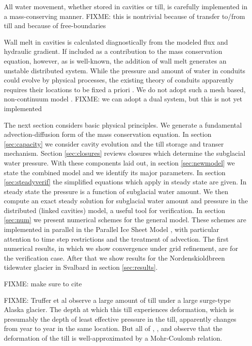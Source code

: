 \documentclass[11pt,final]{amsart}
\begin{document}
All water movement, whether stored in cavities or till, is carefully implemented in a mass-conserving manner.  FIXME: this is nontrivial because of transfer to/from till and because of free-boundaries

Wall melt in cavities is calculated diagnostically from the modeled flux and hydraulic gradient.  If included as a contribution to the mass conservation equation, however, as is well-known, the addition of wall melt generates an unstable distributed system.  While the pressure and amount of water in conduits could evolve by physical processes, the existing theory of conduits apparently requires their locations to be fixed a priori \citep{Hewittetal2012,PimentelFlowers2011,Schoofmeltsupply}.  We do not adopt such a mesh based, non-continuum model \citep[compare][]{Hewittetal2012}.  FIXME: we can adopt a dual system, but this is not yet implemented

The next section considers basic physical principles.  We generate a fundamental advection-diffusion form of the mass conservation equation.  In section \ref{sec:capacity} we consider cavity evolution and the till storage and transer mechanism.  Section \ref{sec:closures} reviews closures which determine the subglacial water pressure.  With these components laid out, in section \ref{sec:newmodel} we state the combined model and we identify its major parameters.  In section \ref{sec:steadyverif} the simplified equations which apply in steady state are given.  In steady state the pressure is a function of subglacial water amount.  We then compute an exact steady solution for subglacial water amount and pressure in the distributed (linked cavities) model, a useful tool for verification.  In section \ref{sec:num} we present numerical schemes for the general model.  These schemes are implemented in parallel in the Parallel Ice Sheet Model \citep{pism-user-manual}, with particular attention to time step restrictions and the treatment of advection.  The first numerical results, in which we show convergence under grid refinement, are for the verification case.  After that we show results for the Nordenskioldbreen tidewater glacier in Svalbard in section \ref{sec:results}.

FIXME:  make sure to cite \citep{Hewitt2013,vanderWeletal2013}

FIXME:  Truffer et al \citep{TrufferHarrisonEchelmeyer2000,TrufferEchelmeyerHarrison2001,TrufferHarrison2006} observe a large amount of till under a large surge-type Alaska glacier.  The depth at which this till experiences deformation, which is presumably the depth of least effective pressure in the till, apparently changes from year to year in the same location.  But all of \cite{Hookeetal1997}, \cite{TrufferEchelmeyerHarrison2001}, and \cite{Tulaczyketal2000} observe that the deformation of the till is well-approximated by a Mohr-Coulomb relation.
\end{document}
